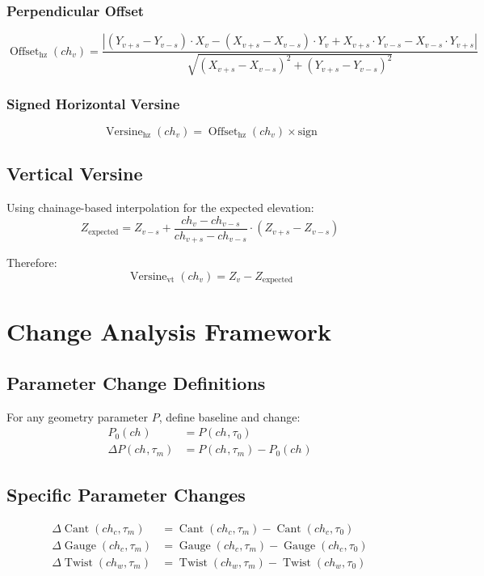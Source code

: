 \documentclass{article}
\DeclareMathOperator{\Cant}{Cant}
\DeclareMathOperator{\Gauge}{Gauge}
\DeclareMathOperator{\Twist}{Twist}
\DeclareMathOperator{\Versine}{Versine}
\DeclareMathOperator{\Offset}{Offset}
\newcommand{\time}[1]{\tau_{#1}}
\newcommand{\chainage}[1]{ch_{#1}}
\newcommand{\hdistance}[4]{\sqrt{(#1-#3)^2 + (#2-#4)^2}}
\begin{document}
\subsubsection{Perpendicular Offset}
\begin{equation}
\Offset_{\text{hz}}(\chainage{v}) = \frac{|(Y_{v+s} - Y_{v-s}) \cdot X_v - (X_{v+s} - X_{v-s}) \cdot Y_v + X_{v+s} \cdot Y_{v-s} - X_{v-s} \cdot Y_{v+s}|}{\hdistance{X_{v+s}}{Y_{v+s}}{X_{v-s}}{Y_{v-s}}}
\end{equation}

\subsubsection{Signed Horizontal Versine}
\begin{equation}
\Versine_{\text{hz}}(\chainage{v}) = \Offset_{\text{hz}}(\chainage{v}) \times \text{sign}
\end{equation}

\subsection{Vertical Versine}
Using chainage-based interpolation for the expected elevation:
\begin{equation}
Z_{\text{expected}} = Z_{v-s} + \frac{\chainage{v} - \chainage{v-s}}{\chainage{v+s} - \chainage{v-s}} \cdot (Z_{v+s} - Z_{v-s})
\end{equation}

Therefore:
\begin{equation}
\Versine_{\text{vt}}(\chainage{v}) = Z_v - Z_{\text{expected}}
\end{equation}

\section{Change Analysis Framework}

\subsection{Parameter Change Definitions}
For any geometry parameter $P$, define baseline and change:
\begin{align}
P_0(\chainage{}) &= P(\chainage{}, \time{0}) \\
\Delta P(\chainage{}, \time{m}) &= P(\chainage{}, \time{m}) - P_0(\chainage{})
\end{align}

\subsection{Specific Parameter Changes}
\begin{align}
\Delta\Cant(\chainage{c}, \time{m}) &= \Cant(\chainage{c}, \time{m}) - \Cant(\chainage{c}, \time{0}) \\
\Delta\Gauge(\chainage{c}, \time{m}) &= \Gauge(\chainage{c}, \time{m}) - \Gauge(\chainage{c}, \time{0}) \\
\Delta\Twist(\chainage{w}, \time{m}) &= \Twist(\chainage{w}, \time{m}) - \Twist(\chainage{w}, \time{0})
\end{align}
\end{document}

